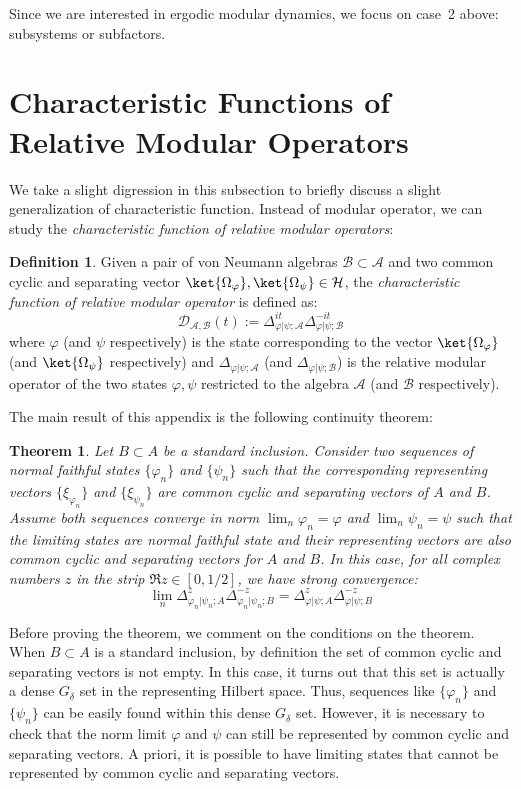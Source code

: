 \documentclass[a4paper,11pt]{article}
\newtheorem{theorem}{Theorem}
\theoremstyle{definition}
\newtheorem{definition}{Definition}[section]
\theoremstyle{remark}
\begin{document}
Since we are interested in ergodic modular dynamics, we focus on case~2 above:
subsystems or subfactors.
 

\section{Characteristic Functions of Relative Modular Operators}\label{app:relcharacter}
We take a slight digression in this subsection to briefly discuss a slight generalization of characteristic function. Instead of modular operator, we can study the \textit{characteristic function of relative modular operators}:
\begin{definition}
    Given a pair of von Neumann algebras $\mathcal{B}\subset\mathcal{A}$ and two common cyclic and separating vector $\ket{\Omega_\varphi}, \ket{\Omega_\psi}\in\mathcal{H}$, the \textit{characteristic function of relative modular operator} is defined as:
    \begin{equation}
        \mathcal{D}_{\mathcal{A}, \mathcal{B}}(t) := \Delta_\mathcal{\varphi|\psi;\mathcal{A}}^{it}\Delta_{\varphi|\psi;\mathcal{B}}^{-it}
    \end{equation}
    where $\varphi$ (and $\psi$ respectively) is the state corresponding to the vector $\ket{\Omega_\varphi}$ (and $\ket{\Omega_\psi}$ respectively) and $\Delta_{\varphi|\psi;\mathcal{A}}$ (and $\Delta_{\varphi|\psi;\mathcal{B}}$) is the relative modular operator of the two states $\varphi,\psi$ restricted to the algebra $\mathcal{A}$ (and $\mathcal{B}$ respectively).
\end{definition}
The main result of this appendix is the following continuity theorem:
\begin{theorem}
    Let $B\subset A$ be a standard inclusion. Consider two sequences of normal faithful states $\{\varphi_n\}$ and $\{\psi_n\}$ such that the corresponding representing vectors $\{\xi_{\varphi_n}\}$ and $\{\xi_{\psi_n}\}$ are common cyclic and separating vectors of $A$ and $B$. Assume both sequences converge in norm $\lim_n\varphi_n = \varphi$ and $\lim_n\psi_n = \psi$ such that the limiting states are normal faithful state and their representing vectors are also common cyclic and separating vectors for $A$ and $B$. In this case, for all complex numbers $z$ in the strip $\Re{z}\in[0, 1/2]$, we have strong convergence:
    \begin{equation}
        \lim_n \Delta_{\varphi_n|\psi_n;A}^z \Delta_{\varphi_n|\psi_n;B}^{-z} = \Delta^z_{\varphi|\psi;A}\Delta^{-z}_{\varphi|\psi; B}
    \end{equation}
\end{theorem}
Before proving the theorem, we comment on the conditions on the theorem. When $B\subset A$ is a standard inclusion, by definition the set of common cyclic and separating vectors is not empty. In this case, it turns out that this set is actually a dense $G_\delta$ set in the representing Hilbert space. Thus, sequences like $\{\varphi_n\}$ and $\{\psi_n\}$ can be easily found within this dense $G_\delta$ set. However, it is necessary to check that the norm limit $\varphi$ and $\psi$ can still be represented by common cyclic and separating vectors. A priori, it is possible to have limiting states that cannot be represented by common cyclic and separating vectors.
\end{document}
